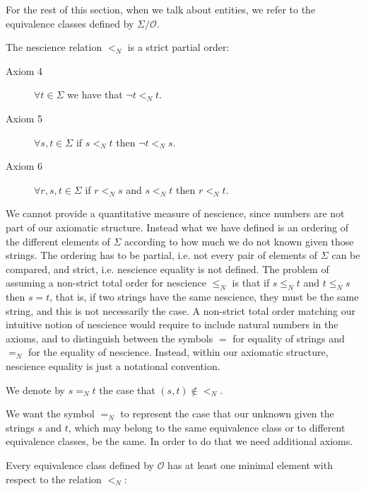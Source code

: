 For the rest of this section, when we talk about entities, we refer to the equivalence classes defined by $\Sigma / \mathcal{O}$.

The nescience relation $<_N$ is a strict partial order:

\vskip 0.25cm

\begin{description}
\item[Axiom 4] $\forall t \in \Sigma$ we have that $\lnot t <_N t$.
\item[Axiom 5] $\forall s , t \in \Sigma$ if $s <_N t$ then $\lnot t <_N s$.
\item[Axiom 6] $\forall r , s, t \in \Sigma$ if $r <_N s$ and $s <_N t$ then $r <_N t$.
\end{description}

\vskip 0.25cm

We cannot provide a quantitative measure of nescience, since numbers are not part of our axiomatic structure. Instead what we have defined is an ordering of the different elements of $\Sigma$ according to how much we do not known given those strings. The ordering has to be partial, i.e. not every pair of elements of $\Sigma$ can be compared, and strict, i.e. nescience equality is not defined. The problem of assuming a non-strict total order for nescience $\leq_N$ is that if $s \leq_N t$ and $t \leq_N s$ then $s = t$, that is, if two strings have the same nescience, they must be the same string, and this is not necessarily the case. A non-strict total order matching our intuitive notion of nescience would require to include natural numbers in the axioms, and to distinguish between the symbols $=$ for equality of strings and $=_N$ for the equality of nescience. Instead, within our axiomatic structure, nescience equality is just a notational convention.

\begin{notation}
We denote by $ s =_N t$ the case that $(s, t) \notin <_N$.
\end{notation}

We want the symbol $=_N$ to represent the case that our unknown given the strings $s$ and $t$, which may belong to the same equivalence class or to different equivalence classes, be the same. In order to do that we need additional axioms.

Every equivalence class defined by $\mathcal{O}$ has at least one minimal element with respect to the relation $<_N$:

\vskip 0.25cm

